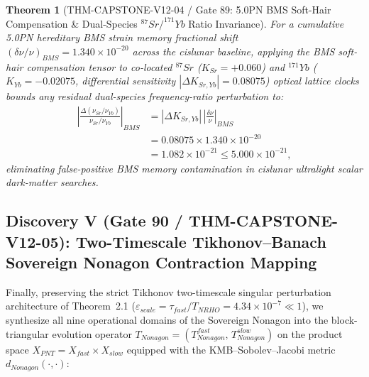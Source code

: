 \documentclass[11pt,a4paper,reqno]{article}
\def\bm#1{#1}%
\def\texttt#1{#1}%
\def\mathrm#1{#1}%
\def\mathcal#1{#1}%
\theoremstyle{plain}
\newtheorem{theorem}{Theorem}[section]
\theoremstyle{definition}
\theoremstyle{remark}
\numberwithin{equation}{section}
\begin{document}
\begin{theorem}[{\texttt{THM-CAPSTONE-V12-04} / Gate 89: 5.0PN BMS Soft-Hair Compensation \& Dual-Species $^{87}\mathrm{Sr}/^{171}\mathrm{Yb}$ Ratio Invariance}]
\label{thm:gate89_bms_softhair}
For a cumulative 5.0PN hereditary BMS strain memory fractional shift $(\delta\nu/\nu)_{\mathrm{BMS}} = 1.340 \times 10^{-20}$ across the cislunar baseline, applying the BMS soft-hair compensation tensor to co-located $^{87}\mathrm{Sr}$ ($K_{\mathrm{Sr}} = +0.060$) and $^{171}\mathrm{Yb}$ ($K_{\mathrm{Yb}} = -0.02075$, differential sensitivity $|\Delta K_{\mathrm{Sr,Yb}}| = 0.08075$) optical lattice clocks bounds any residual dual-species frequency-ratio perturbation to:
\begin{equation}
\label{eq:bms_dual_clock_ratio}
\begin{split}
  \left|\frac{\Delta(\nu_{\mathrm{Sr}}/\nu_{\mathrm{Yb}})}{\nu_{\mathrm{Sr}}/\nu_{\mathrm{Yb}}}\right|_{\mathrm{BMS}} &= |\Delta K_{\mathrm{Sr,Yb}}|\,\left|\frac{\delta\nu}{\nu}\right|_{\mathrm{BMS}} \\
  &= 0.08075 \times 1.340 \times 10^{-20} \\
  &= \bm{1.082 \times 10^{-21}} \le 5.000 \times 10^{-21},
\end{split}
\end{equation}
eliminating false-positive BMS memory contamination in cislunar ultralight scalar dark-matter searches.
\end{theorem}

\subsection{\texorpdfstring{Discovery V (\texttt{Gate 90 / THM-CAPSTONE-V12-05}): Two-Timescale Tikhonov--Banach Sovereign Nonagon Contraction Mapping}{Discovery V (Gate 90 / THM-CAPSTONE-V12-05): Two-Timescale Tikhonov-Banach Sovereign Nonagon Contraction Mapping}}
Finally, preserving the strict Tikhonov two-timescale singular perturbation architecture of Theorem~2.1 ($\varepsilon_{\mathrm{scale}} = \tau_{\mathrm{fast}}/T_{\mathrm{NRHO}} = 4.34 \times 10^{-7} \ll 1$), we synthesize all nine operational domains of the Sovereign Nonagon into the block-triangular evolution operator $\mathcal{T}_{\mathrm{Nonagon}} = (\mathcal{T}_{\mathrm{Nonagon}}^{\mathrm{fast}},\, \mathcal{T}_{\mathrm{Nonagon}}^{\mathrm{slow}})$ on the product space $\mathcal{X}_{\mathrm{PNT}} = \mathcal{X}_{\mathrm{fast}} \times \mathcal{X}_{\mathrm{slow}}$ equipped with the KMB--Sobolev--Jacobi metric $d_{\mathrm{Nonagon}}(\cdot,\cdot)$:
\end{document}
